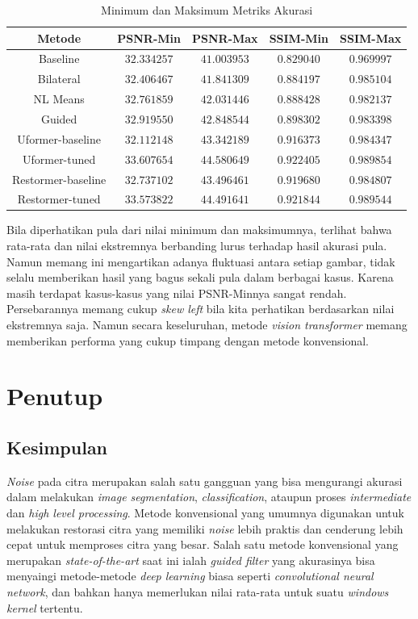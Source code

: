 \documentclass[11pt, a4paper, final]{report}
\begin{document}
\begin{table}[H]
\centering
\begin{tabular}{|c|c|c|c|c|}
\hline
Metode             & PSNR-Min    & PSNR-Max    & SSIM-Min   & SSIM-Max   \\ \hline
Baseline           & $32.334257$ & $41.003953$ & $0.829040$ & $0.969997$ \\ \hline
Bilateral          & $32.406467$ & $41.841309$ & $0.884197$ & $0.985104$ \\ \hline
NL Means           & $32.761859$ & $42.031446$ & $0.888428$ & $0.982137$ \\ \hline
Guided             & $32.919550$ & $42.848544$ & $0.898302$ & $0.983398$ \\ \hline
Uformer-baseline   & $32.112148$ & $43.342189$ & $0.916373$ & $0.984347$ \\ \hline
Uformer-tuned      & $33.607654$ & $44.580649$ & $0.922405$ & $0.989854$ \\ \hline
Restormer-baseline & $32.737102$ & $43.496461$ & $0.919680$ & $0.984807$ \\ \hline
Restormer-tuned    & $33.573822$ & $44.491641$ & $0.921844$ & $0.989544$ \\ \hline
\end{tabular}
    \caption{Minimum dan Maksimum Metriks Akurasi}
\end{table}

Bila diperhatikan pula dari nilai minimum dan maksimumnya, terlihat bahwa rata-rata dan nilai ekstremnya berbanding lurus terhadap hasil akurasi pula. Namun memang ini mengartikan adanya fluktuasi antara setiap gambar, tidak selalu memberikan hasil yang bagus sekali pula dalam berbagai kasus. Karena masih terdapat kasus-kasus yang nilai PSNR-Minnya sangat rendah. Persebarannya memang cukup \textit{skew left} bila kita perhatikan berdasarkan nilai ekstremnya saja. Namun secara keseluruhan, metode \textit{vision transformer} memang memberikan performa yang cukup timpang dengan metode konvensional.

\chapter{Penutup}

\section{Kesimpulan}

\textit{Noise} pada citra merupakan salah satu gangguan yang bisa mengurangi akurasi dalam melakukan \textit{image segmentation}, \textit{classification}, ataupun proses \textit{intermediate} dan \textit{high level processing}. Metode konvensional yang umumnya digunakan untuk melakukan restorasi citra yang memiliki \textit{noise} lebih praktis dan cenderung lebih cepat untuk memproses citra yang besar. Salah satu metode konvensional yang merupakan \textit{state-of-the-art} saat ini ialah \textit{guided filter} yang akurasinya bisa menyaingi metode-metode \textit{deep learning} biasa seperti \textit{convolutional neural network}, dan bahkan hanya memerlukan nilai rata-rata untuk suatu \textit{windows kernel} tertentu. 
\end{document}
